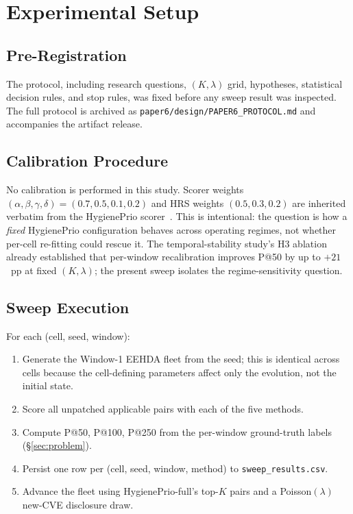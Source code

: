 \section{Experimental Setup}

\subsection{Pre-Registration}

The protocol, including research questions, $(K, \lambda)$ grid,
hypotheses, statistical decision rules, and stop rules, was fixed
before any sweep result was inspected. The full protocol is archived as
\texttt{paper6/design/PAPER6\_PROTOCOL.md} and accompanies the artifact
release.

\subsection{Calibration Procedure}

No calibration is performed in this study. Scorer weights
$(\alpha, \beta, \gamma, \delta) = (0.7, 0.5, 0.1, 0.2)$ and HRS
weights $(0.5, 0.3, 0.2)$ are inherited verbatim from
the HygienePrio scorer~\cite{paper4hygieneprio}. This is intentional: the question is
how a \textit{fixed} HygienePrio configuration behaves across operating
regimes, not whether per-cell re-fitting could rescue it. The temporal-stability study's H3
ablation already established that per-window recalibration improves
P@50 by up to $+21$~pp at fixed $(K, \lambda)$; the present sweep
isolates the regime-sensitivity question.

\subsection{Sweep Execution}

For each (cell, seed, window):
\begin{enumerate}
\item Generate the Window-1 EEHDA fleet from the seed; this is
identical across cells because the cell-defining parameters affect only
the evolution, not the initial state.
\item Score all unpatched applicable pairs with each of the five methods.
\item Compute P@50, P@100, P@250 from the per-window ground-truth
labels (\S\ref{sec:problem}).
\item Persist one row per (cell, seed, window, method) to
\texttt{sweep\_results.csv}.
\item Advance the fleet using HygienePrio-full's top-$K$ pairs and a
Poisson$(\lambda)$ new-CVE disclosure draw.
\end{enumerate}

